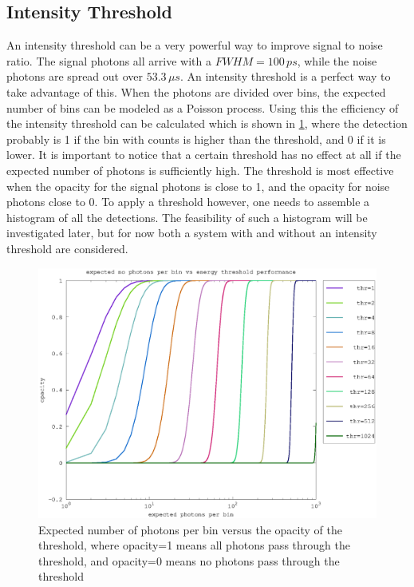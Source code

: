 \subsection{Intensity Threshold}\label{sssec:energy_threshold}
An intensity threshold can be a very powerful way to improve signal to noise ratio. The signal photons all arrive with a $FWHM = 100\,ps$, while the noise photons are spread out over $53.3\,\mu s$. An intensity threshold is a perfect way to take advantage of this. When the photons are divided over bins, the expected number of bins can be modeled as a Poisson process. Using this the efficiency of the intensity threshold can be calculated which is shown in \cref{fig:threshold_efficiency}, where the detection probably is 1 if the bin with counts is higher than the threshold, and 0 if it is lower. It is important to notice that a certain threshold has no effect at all if the expected number of photons is sufficiently high. The threshold is most effective when the opacity for the signal photons is close to 1, and the opacity for noise photons close to 0. To apply a threshold however, one needs to assemble a histogram of all the detections. The feasibility of such a histogram will be investigated later, but for now both a system with and without an intensity threshold are considered.  

\begin{figure}[H]
\centering
	\includegraphics[width=0.8\linewidth]{fig/threshold_efficiency.eps}
\caption{Expected number of photons per bin versus the opacity of the threshold, where opacity=1 means all photons pass through the threshold, and opacity=0 means no photons pass through the threshold}
\label{fig:threshold_efficiency}
\end{figure}


